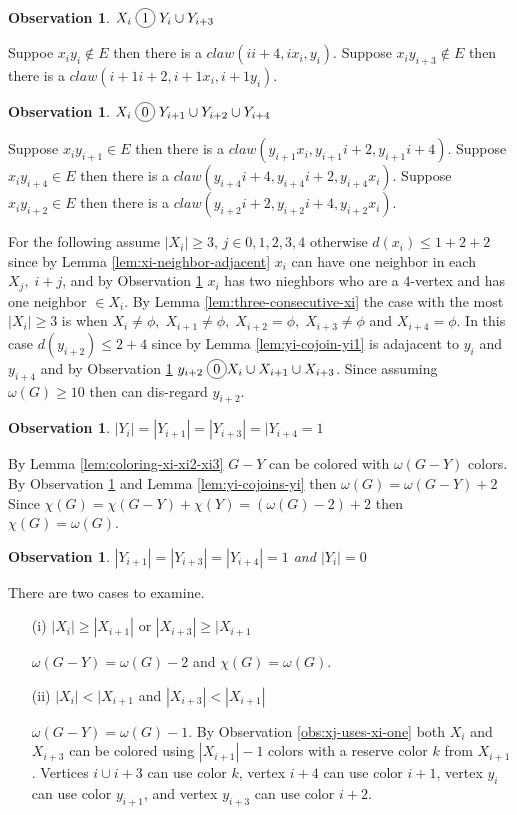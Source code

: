 \documentclass[12pt]{article}
\newcommand*\circled[1]{\tikz[baseline=(char.base)]{
            \node[shape=circle,draw,inner sep=2pt] (char) {#1};}}
\newtheorem{Observation}[Theorem]{Observation}
\begin{document}
\begin{Observation}\label{obs:xi-joins-yi}
$X_i \; \circled{1} \; Y_i \cup Y_{i+3}$
\end{Observation}
 Suppoe $x_iy_i \not \in E$ then there is a $claw (ii+4, ix_i, y_i)$. Suppose $x_iy_{i+3} \not \in E$ then there is a $claw (i+1i+2, i+1x_i, i+1y_i)$.

\begin{Observation}\label{obs:xi-cojoins-yi}
$X_i \; \circled{0} \; Y_{i+1} \cup Y_{i+2} \cup Y_{i+4}$
\end{Observation}
 Suppose $x_iy_{i+1} \in E$ then there is a $claw (y_{i+1}x_i, y_{i+1}i+2,y_{i+1}i+4)$. Suppose $x_iy_{i+4} \in E$ then there is a $claw (y_{i+4}i+4, y_{i+4}i+2, y_{i+4}x_i)$. Suppose $x_iy_{i+2} \in E$ then there is a $claw (y_{i+2}i+2, y_{i+2}i+4, y_{i+2}x_i)$.

For the following assume $|X_i| \geq 3,\, j \in {0,1,2,3,4}$ otherwise $d(x_i) \leq 1 + 2 + 2$ since by Lemma \ref{lem:xi-neighbor-adjacent} $x_i$ can have one neighbor in each $X_j,\; i+j$, and by Observation \ref{obs:xi-cojoins-yi} $x_i$ has two nieghbors who are a $4$-vertex and has one neighbor $\in X_i$. By Lemma \ref{lem:three-consecutive-xi} the case with the most $|X_i| \geq 3$ is when $X_i \neq \phi,\; X_{i+1} \neq \phi,\; X_{i+2} = \phi,\; X_{i+3} \neq \phi$ and $X_{i+4} = \phi$. In this case $d(y_{i+2}) \leq 2 + 4$ since by Lemma \ref{lem:yi-cojoin-yi1} is adajacent to $y_{i}$ and $y_{i+4}$ and by Observation \ref{obs:xi-cojoins-yi} $y_{i+2} \; \circled{0} X_i \cup X_{i+1} \cup X_{i+3}$. Since assuming $\omega (G) \geq 10$ then can dis-regard $y_{i+2}$.

\begin{Observation}\label{obs:four-yi} 
$|Y_i| = |Y_{i+1}| = |Y_{i+3}| = |Y_{i+4} =  1$
\end{Observation}
 By Lemma \ref{lem:coloring-xi-xi2-xi3} $G - Y$ can be colored with $\omega(G - Y)$ colors. By Observation \ref{obs:xi-joins-yi} and Lemma \ref{lem:yi-cojoins-yi} then $\omega(G) = \omega(G - Y) + 2$ Since $\chi(G) = \chi(G - Y) + \chi(Y) = (\omega(G) - 2) + 2$ then $\chi(G) = \omega(G)$.

\begin{Observation}\label{obs:yi1-yi3-yi4} 
$|Y_{i+1}| = |Y_{i+3}| =  |Y_{i+4}| = 1$ and $|Y_{i}| = 0$
\end{Observation}
 There are two cases to examine.
	\begin{itemize}
	\item[(i)]
		$|X_i| \geq |X_{i+1}|$ or $|X_{i+3}| \geq |X_{i+1}$

		$\omega(G - Y) = \omega(G) - 2$ and $\chi(G) = \omega(G)$.
	\item[(ii)]
		$|X_i| < |X_{i+1}$ and $|X_{i+3}| < |X_{i+1}|$

		$\omega(G- Y) = \omega(G) - 1$. By Observation \ref{obs:xj-uses-xi-one} both $X_{i}$ and $X_{i+3}$ can be colored using $|X_{i+1}| - 1$ colors with a reserve color $k$ from $X_{i+1}$. Vertices $i \cup i+3$ can use color $k$, vertex $i+4$ can use color $i+1$, vertex $y_i$ can use color $y_{i+1}$, and vertex $y_{i+3}$ can use color $i+2$. 
	\end{itemize}
\end{document}
